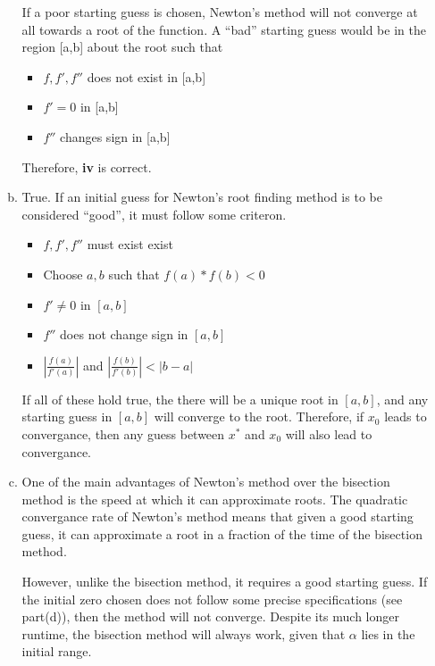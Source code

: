 \documentclass[11pt]{article}
\begin{document}
\begin{enumerate}
\begin{enumerate}[(a)]
			If a poor starting guess is chosen, Newton's method will not converge at all towards a root of the function. A ``bad'' starting guess would be in
			the region [a,b] about the root such that

			\begin{itemize}
				\item $f,f', f''$ does not exist in [a,b]
				\item $f' = 0$ in [a,b]
				\item $f''$ changes sign in [a,b] \\
			\end{itemize}

			\begin{center}
				Therefore, \textbf{iv} is correct. \\
			\end{center}

			\newpage

		\item True. If an initial guess for Newton's root finding method is to be considered ``good'', it must follow some criteron.
		\begin{itemize}
			\item $f, f', f''$ must exist exist

			\item Choose $a,b$ such that $f(a)*f(b)<0$

			\item $f' \neq 0$ in $[a,b]$

			\item $f''$ does not change sign in $[a,b]$

			\item $|\frac{f(a)}{f'(a)}|$ and $|\frac{f(b)}{f'(b)}| < |b-a|$
		\end{itemize}

		If all of these hold true, the there will be a unique root in $[a,b]$, and any starting guess in $[a,b]$ will
		converge to the root. Therefore, if $x_0$ leads to convergance, then any guess between $x^*$ and $x_0$ will also
		lead to convergance. \\

		\item One of the main advantages of Newton's method over the bisection method is the speed at which it can approximate roots.
		The quadratic convergance rate of Newton's method means that given a good starting guess, it can approximate a root in a
		fraction of the time of the bisection method.

		However, unlike the bisection method, it requires a good starting guess. If
		the initial zero chosen does not follow some precise specifications (see part(d)), then the method will not converge. Despite
		its much longer runtime, the bisection method will always work, given that $\alpha$ lies in the initial range.


\end{enumerate}
\end{enumerate}
\end{document}
